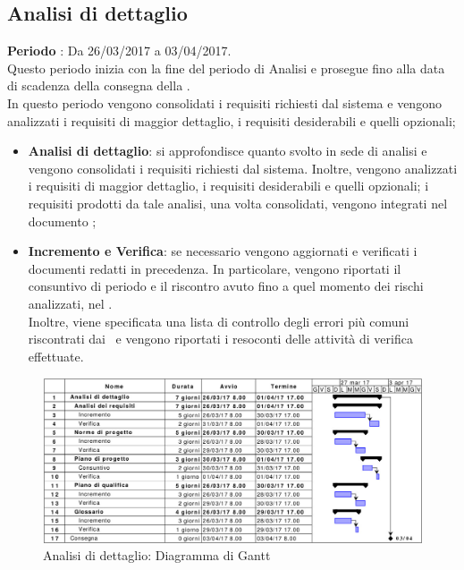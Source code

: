 \documentclass[../PianoDiProgetto.tex]{subfiles}
\begin{document}
		\subsection{Analisi di dettaglio}
		\textbf{Periodo} : Da 26/03/2017 a 03/04/2017. \\
		Questo periodo inizia con la fine del periodo di Analisi e prosegue fino alla data di scadenza della consegna della \revisionedeirequisiti. \\
		In questo periodo vengono consolidati i requisiti richiesti dal sistema e vengono analizzati i requisiti di maggior dettaglio, i requisiti desiderabili e quelli opzionali; 
		\begin{itemize}
			\item \textbf{Analisi di dettaglio}: si approfondisce quanto svolto in sede di analisi e vengono consolidati i requisiti richiesti dal sistema. Inoltre, vengono analizzati i requisiti di maggior dettaglio, i requisiti desiderabili e quelli opzionali; i requisiti prodotti da tale analisi, una volta consolidati, vengono integrati nel documento \analisideirequisiti;
			\item \textbf{Incremento e Verifica}: se necessario vengono aggiornati e verificati i documenti redatti in precedenza. In particolare, vengono riportati il consuntivo di periodo e il riscontro avuto fino a quel momento dei rischi analizzati, nel \pianodiprogetto. \\ Inoltre, viene specificata una lista di controllo degli errori più comuni riscontrati dai \verificatori\ e vengono riportati i resoconti delle attività di verifica effettuate.
		\end{itemize}
		\begin{figure}[H]
			\centering
			\includegraphics[scale=0.55]{Figures/Gantt_AnalisiDettaglio.jpg}
			\caption{Analisi di dettaglio: Diagramma di Gantt}
		\end{figure}
	
\end{document}
